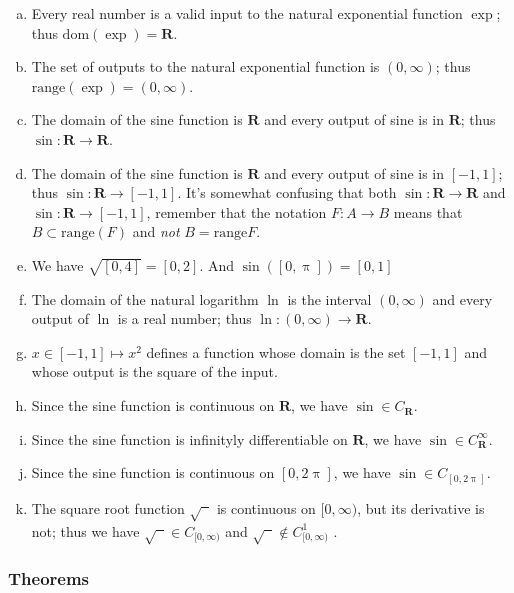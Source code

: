 \documentclass[12pt]{article}
\newenvironment{alphalist}{
  \begin{enumerate}[(a)]
    \addtolength{\itemsep}{-0.5\itemsep}}
  {\end{enumerate}}
\newcommand{\dom}{\mathrm{dom}}
\newcommand{\range}{\mathrm{range}}
\newcommand{\reals}{\mathbf{R}}
\begin{document}
\begin{alphalist}
\item Every real number is a valid input to the natural exponential function \(\exp\); thus \(\dom(\exp) = \reals\).

\item The set of outputs to the  natural exponential function is \((0,\infty) \); thus \(\range(\exp) = (0,\infty)\).

\item The domain of the sine function is $\reals$ and every output of sine is in $\reals$; thus $\sin : \reals \to \reals$.


\item The domain of the sine function is $\reals$ and every output of sine is in $[-1,1]$; thus $\sin : \reals \to [-1,1]$.
It's somewhat confusing that both $\sin : \reals \to \reals$ and $\sin : \reals \to [-1,1]$, remember that the notation
$F : A \to B$ means that $B \subset \range(F)$ and \emph{not} $B =\range{F}$.


\item  We have $\sqrt{[0,4] } = [0,2]$. And $\sin([0,\uppi]) = [0,1]$


\item The domain of the natural logarithm $\ln$ is the interval $(0,\infty)$ and every output of \(\ln\) is a real number; thus
$\ln : (0,\infty) \to \reals$.


\item $x \in [-1,1] \mapsto x^2$ defines a function whose domain is the set $[-1,1]$ and whose output is the square of
the input.


\item Since the sine function is continuous on \(\reals\), we have $\sin \in C_\reals$.

\item Since the sine function is infinityly differentiable on  \(\reals\), we have $\sin \in C_\reals^\infty$.

\item Since the sine function is continuous on \([0,2 \uppi]\), we have \(\sin \in C_{[0,2 \uppi]}\).

\item The square root function \(\sqrt{\phantom{x}}\) is continuous on \([0,\infty)\), but its derivative is not; thus we have
\(\sqrt{\phantom{x}} \in C_{[0,\infty)} \) and  \(\sqrt{\phantom{x}} \notin C_{[0,\infty)}^1 \) .
\end{alphalist}

\subsubsection*{Theorems}
\end{document}
